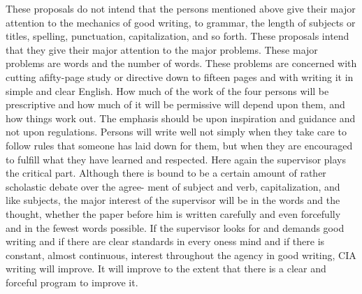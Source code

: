 \documentclass[
    oneside,
    11pt,
    draft
]{memoir}
\begin{document}
These proposals do not intend that the persons mentioned above give their major attention to the mechanics of good writing, to grammar, the length of subjects or titles, spelling, punctuation, capitalization, and so forth. These proposals intend that they give their major attention to the major problems. These major problems are words and the number of words. These problems are concerned with cutting afifty-page study or directive down to fifteen pages and with writing it in simple and clear English. How much of the work of the four persons will be prescriptive and how much of it will be permissive will depend upon them, and how things work out. The emphasis should be upon inspiration and guidance and not upon regulations. Persons will write well not simply when they take care to follow rules that someone has laid down for them, but when they are encouraged to fulfill what they have learned and respected. Here again the supervisor plays the critical part. Although there is bound to be a certain amount of rather scholastic debate over the agree- ment of subject and verb, capitalization, and like subjects, the major interest of the supervisor will be in the words and the thought, whether the paper before him is written carefully and even forcefully and in the fewest words possible. If the supervisor looks for and demands good writing and if there are clear standards in every oness mind and if there is constant, almost continuous, interest throughout the agency in good writing, CIA writing will improve. It will improve to the extent that there is a clear and forceful program to improve it.
\end{document}
